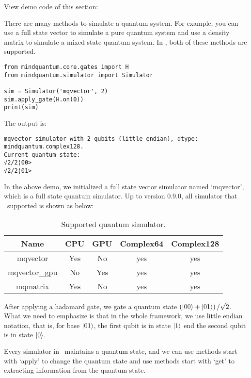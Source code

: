 View demo code of this section: 

There are many methods to simulate a quantum system. For example, you can use a full state vector to simulate a pure quantum system and use a density matrix to simulate a mixed state quantum system. In \MindQuantum, both of these methods are supported.

\begin{lstlisting}
from mindquantum.core.gates import H
from mindquantum.simulator import Simulator

sim = Simulator('mqvector', 2)
sim.apply_gate(H.on(0))
print(sim)
\end{lstlisting}
The output is:

\begin{lstlisting}
mqvector simulator with 2 qubits (little endian), dtype: mindquantum.complex128.
Current quantum state:
√2/2¦00>
√2/2¦01>
\end{lstlisting}

In the above demo, we initialized a full state vector simulator named `mqvector', which is a full state quantum simulator. Up to version 0.9.0, all simulator that \MindQuantum\ supported is shown as below:
\begin{table}[ht]
    \begin{tabular}{ccccc}
        \toprule
        Name          & CPU & GPU & Complex64 & Complex128 \\
        \midrule
        mqvector      & Yes & No  & yes       & yes        \\
        mqvector\_gpu & No  & Yes & yes       & yes        \\
        mqmatrix      & Yes & No  & yes       & yes        \\
        \bottomrule
    \end{tabular}
    \caption{Supported quantum simulator.}
    \label{tab:simulator_supported}
\end{table}
After applying a hadamard gate, we gate a quantum state $\left(\ket{00}+\ket{01}\right)/\sqrt{2}$. What we need to emphasize is that in the whole framework, we use little endian notation, that is, for base $\ket{01}$, the first qubit is in state $\ket{1}$ end the second qubit is in state $\ket{0}$.

Every simulator in \MindQuantum\ maintains a quantum state, and we can use methods start with `apply' to change the quantum state and use methods start with `get' to extracting information from the quantum state.

